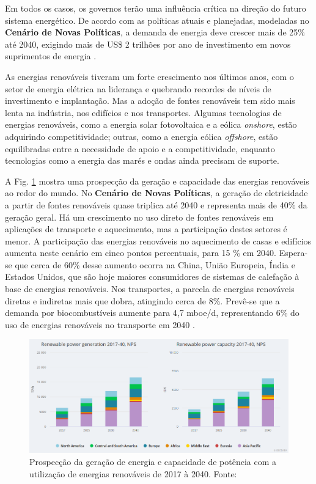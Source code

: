 Em todos os casos, os governos terão uma influência crítica na direção do futuro sistema energético. 
De acordo com as políticas atuais e planejadas, modeladas no \textbf{Cenário de Novas Políticas}, a demanda de energia deve crescer mais de 25\% até 2040, exigindo mais de US\$ 2 trilhões por ano de investimento em novos suprimentos de energia \cite{WEO2018}.

As energias renováveis tiveram um forte crescimento nos últimos anos, com o setor de energia elétrica na liderança e quebrando recordes de níveis de investimento e implantação.
Mas a adoção de fontes renováveis tem sido mais lenta na indústria, nos edifícios e nos transportes.
Algumas tecnologias de energias renováveis, como a energia solar fotovoltaica e a eólica \textit{onshore}, estão adquirindo competitividade; outras, como a energia eólica \textit{offshore}, estão equilibradas entre a necessidade de apoio e a competitividade, enquanto tecnologias como a energia das marés e ondas ainda precisam de suporte.

A Fig. \ref{fig:geracao-capacidade-energias-renovaveis} mostra uma prospecção da geração e capacidade das energias renováveis ao redor do mundo. 
No \textbf{Cenário de Novas Políticas}, a geração de eletricidade a partir de fontes renováveis quase triplica até 2040 e representa mais de 40\% da geração geral.
Há um crescimento no uso direto de fontes renováveis em aplicações de transporte e aquecimento, mas a participação destes setores é menor.
A participação das energias renováveis no aquecimento de casas e edifícios aumenta neste cenário em cinco pontos percentuais, para 15 \% em 2040.
Espera-se que cerca de 60\% desse aumento ocorra na China, União Europeia, Índia e Estados Unidos, que são hoje maiores consumidores de sistemas de calefação à base de energias renováveis.
Nos transportes, a parcela de energias renováveis diretas e indiretas mais que dobra, atingindo cerca de 8\%. 
Prevê-se que a demanda por biocombustíveis aumente para 4,7 mboe/d, representando 6\% do uso de energias renováveis no transporte em 2040 \cite{WEO2018}.

\begin{figure}[!hbt]
	\begin{center}
    \includegraphics[width=\textwidth]{figuras/geracao_capacidade_potencia_energias_renovaveis.png}
    \caption{Prospecção da geração de energia e capacidade de potência com a utilização de energias renováveis de 2017 à 2040. Fonte: \cite{WEO2018}}
    \label{fig:geracao-capacidade-energias-renovaveis}
    \end{center}
\end{figure}


